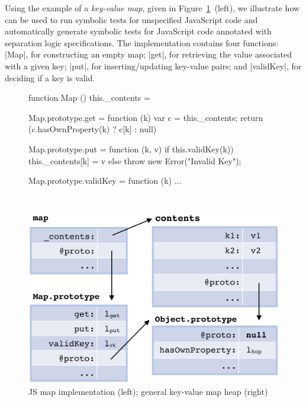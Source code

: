 

Using the example of a \emph{key-value map}, given in Figure~\ref{map:example}~(left), we illustrate how \jilette can be used to run symbolic tests for unspecified JavaScript code and automatically generate symbolic tests for JavaScript code annotated with separation logic specifications.
The implementation contains four functions: 
\jsinline|Map|, for constructing an empty map;
\jsinline|get|, for retrieving the value associated with a given key;
\jsinline|put|, for inserting/updating key-value pairs; and \jsinline|validKey|, for deciding if a key is valid.

 \begin{figure}[h!]
 \vspace*{-0.3cm}
 \begin{minipage}{0.5\textwidth}
 \begin{lstjs}[firstnumber=1]
function Map () { this._contents = {} }

Map.prototype.get = function (k) {
  var c = this._contents;
  return (c.hasOwnProperty(k) ? c[k] : null)
}

Map.prototype.put = function (k, v) {
  if this.validKey(k)) {  
    this._contents[k] = v   
  } else throw new Error("Invalid Key");
} 

Map.prototype.validKey = function (k) { ... }
\end{lstjs}
\end{minipage}
\ 
 \begin{minipage}{0.45\textwidth}
 \includegraphics[width=1\textwidth]{figures/mapDiagram.png}
 \end{minipage}
 \vspace*{-0.3cm}
\caption{JS map implementation (left); general key-value map heap (right) \label{map:example}}
 \vspace*{-0.3cm}
\end{figure}

